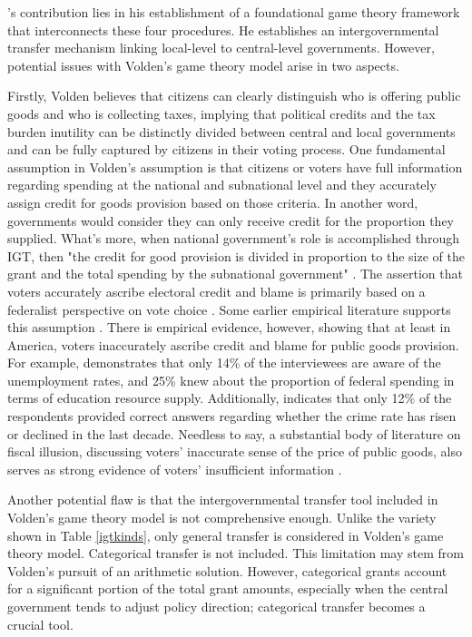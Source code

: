 \documentclass[man]{apa7}
\begin{document}
\Textcite{volden2007intergovernmental}'s contribution lies in his establishment of a foundational game theory framework that interconnects these four procedures. He establishes an intergovernmental transfer mechanism linking local-level to central-level governments. However, potential issues with Volden's game theory model arise in two aspects.

Firstly, Volden believes that citizens can clearly distinguish who is offering public goods and who is collecting taxes, implying that political credits and the tax burden inutility can be distinctly divided between central and local governments and can be fully captured by citizens in their voting process. One fundamental assumption in Volden's assumption is that citizens or voters have full information regarding spending at the national and subnational level and they accurately assign credit for goods provision based on those criteria. In another word, governments would consider they can only receive credit for the proportion they supplied. What's more, when national government's role is accomplished through IGT, then "the credit for good provision is divided in proportion to the size of the grant and the total spending by the subnational government" \parencite{volden2005intergovernmental}. The assertion that voters accurately ascribe electoral credit and blame is primarily based on a federalist perspective on vote choice \parencite{stein1990economic}. Some earlier empirical literature supports this assumption \parencite{atkeson1995economic}. There is empirical evidence, however, showing that at least in America, voters inaccurately ascribe credit and blame for public goods provision. For example, \Textcite{carpini1996americans} demonstrates that only 14\% of the interviewees are aware of the unemployment rates, and 25\% knew about the proportion of federal spending in terms of education resource supply. Additionally, \Textcite{gilens2001political} indicates that only 12\% of the respondents provided correct answers regarding whether the crime rate has risen or declined in the last decade. Needless to say, a substantial body of literature on fiscal illusion, discussing voters' inaccurate sense of the price of public goods, also serves as strong evidence of voters' insufficient information \parencite{oates1979lump,borge1995lump,turnbull1998overspending}.

Another potential flaw is that the intergovernmental transfer tool included in Volden's game theory model is not comprehensive enough. Unlike the variety shown in Table \ref{igtkinds}, only general transfer is considered in Volden's game theory model. Categorical transfer is not included. This limitation may stem from Volden's pursuit of an arithmetic solution. However, categorical grants account for a significant portion of the total grant amounts, especially when the central government tends to adjust policy direction; categorical transfer becomes a crucial tool.
\end{document}
